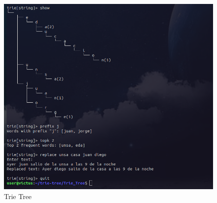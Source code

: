 \documentclass[11pt, a4paper]{article}
\begin{document}
\begin{figure}[H]
  \centering
  \includegraphics[width=1.0\textwidth]{img/E3.png}
  \caption{Trie Tree}
\end{figure}
\end{document}
